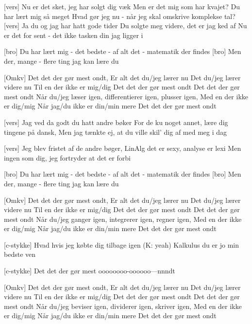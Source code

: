 \documentclass[a4paper,11pt]{article}
\begin{document}
\begin{song}
  [vers] 
  Nu er det sket, jeg har solgt dig væk
  Men er det mig som har kvajet? Du har lært mig så meget
  Hvad gør jeg nu - når jeg skal omskrive komplekse tal?
  [vers] 
  Ja du og jag har hatt gode tider
  Du solgte meg videre, det er jag ked af
  Nu er det for sent - det ikke tasken din jag ligger i

    [bro]
    Du har lært mig - det bedste - af alt det - matematik der findes
   [bro] Men der, mange - flere ting jag kan lære du

    [Omkv] Det det der gør mest ondt, 
    Er alt det du/jeg lærer nu
    Det du/jeg lærer videre nu
    Til en der ikke er mig/dig
    Det det der gør mest ondt
    Det det der gør mest ondt
    Når du/jeg læser igen, differentierer igen, plusser igen,
    Med en der ikke er dig/mig
    Når jag/du ikke er din/min mere
    Det det der gør mest ondt

    [vers] Jag ved da godt du hatt andre bøker
    For de ku noget annet, lære dig tingene på dansk,
    Men jag tænkte ej, at du ville skil' dig af med meg i dag

    [vers] Jeg blev fristet af de andre bøger,
    LinAlg det er sexy, analyse er lexi
    Men ingen som dig, jeg fortryder at det er forbi

     [bro]
    Du har lært mig - det bedste - af alt det - matematik der findes
   [bro] Men der, mange - flere ting jag kan lære du

    [Omkv] Det det der gør mest ondt, 
    Er alt det du/jeg lærer nu
    Det du/jeg lærer videre nu
    Til en der ikke er mig/dig
    Det det der gør mest ondt
    Det det der gør mest ondt
    Når du/jeg ganger igen, integrerer igen, regner igen,
    Med en der ikke er dig/mig
    Når jag/du ikke er din/min mere
    Det det der gør mest ondt

    [c-stykke] Hvad hvis jeg købte dig tilbage igen (K: yeah)
    Kalkulus du er jo min bedste ven

    [c-stykke] Det det der gør mest oooooooo-oooooo---nnndt

     [Omkv] Det det der gør mest ondt, 
    Er alt det du/jeg lærer nu
    Det du/jeg lærer videre nu
    Til en der ikke er mig/dig
    Det det der gør mest ondt
    Det det der gør mest ondt
    Når du/jeg beviser igen, dividerer igen, skriver igen,
    Med en der ikke er dig/mig
    Når jag/du ikke er din/min mere
    Det det der gør mest ondt

    
\end{song}
\end{document}
